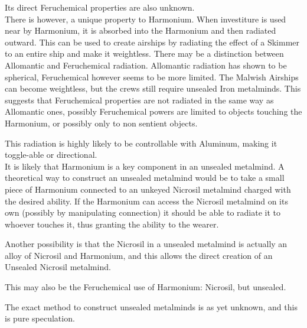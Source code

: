 \documentclass[conference]{IEEEtran}
\begin{document}
Its direct Feruchemical properties are also unknown.\\

There is however, a unique property to Harmonium.  When investiture is used near by Harmonium, it is absorbed into the Harmonium and then radiated outward.\cite{BoM-CH17}  This can be used to create airships by radiating the effect of a Skimmer to an entire ship and make it weightless.\cite{BoM-CH21}  There may be a distinction between Allomantic and Feruchemical radiation.  Allomantic radiation has shown to be spherical,\cite{BoM-CH17} Feruchemical however seems to be more limited.  The Malwish Airships can become weightless, but the crews still require unsealed Iron metalminds.\cite{BoM-CH21}  This suggests that Feruchemical properties are not radiated in the same way as Allomantic ones, possibly Feruchemical powers are limited to objects touching the Harmonium, or possibly only to non sentient objects.

This radiation is highly likely to be controllable with Aluminum, making it toggle-able or directional.\\

It is likely that Harmonium is a key component in an unsealed metalmind.  A theoretical way to construct an unsealed metalmind would be to take a small piece of Harmonium connected to an unkeyed Nicrosil metalmind charged with the desired ability.  If the Harmonium can access the Nicrosil metalmind on its own (possibly by manipulating connection) it should be able to radiate it to whoever touches it, thus granting the ability to the wearer. 

Another possibility is that the Nicrosil in a unsealed metalmind is actually an alloy of Nicrosil and Harmonium, and this allows the direct creation of an Unsealed Nicrosil metalmind.

This may also be the Feruchemical use of Harmonium: Nicrosil, but unsealed.

The exact method to construct unsealed metalminds is as yet unknown, and this is pure speculation.  
\end{document}
